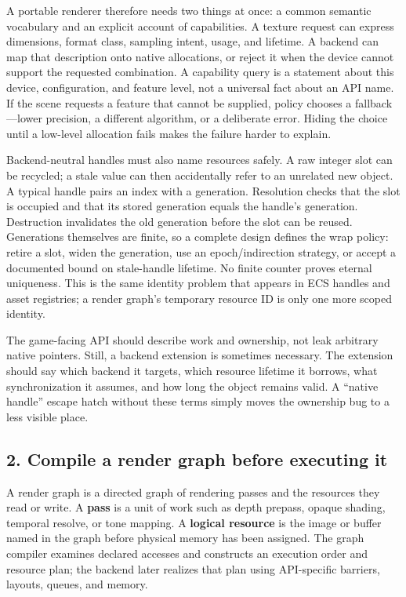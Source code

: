 A portable renderer therefore needs two things at once: a common semantic vocabulary and an explicit account of capabilities. A texture request can express dimensions, format class, sampling intent, usage, and lifetime. A backend can map that description onto native allocations, or reject it when the device cannot support the requested combination. A capability query is a statement about this device, configuration, and feature level, not a universal fact about an API name. If the scene requests a feature that cannot be supplied, policy chooses a fallback---lower precision, a different algorithm, or a deliberate error. Hiding the choice until a low-level allocation fails makes the failure harder to explain.

Backend-neutral handles must also name resources safely. A raw integer slot can be recycled; a stale value can then accidentally refer to an unrelated new object. A typical handle pairs an index with a generation. Resolution checks that the slot is occupied and that its stored generation equals the handle's generation. Destruction invalidates the old generation before the slot can be reused. Generations themselves are finite, so a complete design defines the wrap policy: retire a slot, widen the generation, use an epoch/indirection strategy, or accept a documented bound on stale-handle lifetime. No finite counter proves eternal uniqueness. This is the same identity problem that appears in ECS handles and asset registries; a render graph's temporary resource ID is only one more scoped identity.

The game-facing API should describe work and ownership, not leak arbitrary native pointers. Still, a backend extension is sometimes necessary. The extension should say which backend it targets, which resource lifetime it borrows, what synchronization it assumes, and how long the object remains valid. A ``native handle'' escape hatch without these terms simply moves the ownership bug to a less visible place.

\subsection{2. Compile a render graph before executing it}\label{06-engine-ii-ch042-compile-a-render-graph-before-executing-it}

\hypertarget{06-engine-ii-ch042-compile-a-render-graph-before-executing-it}{}

A render graph is a directed graph of rendering passes and the resources they read or write. A \textbf{pass} is a unit of work such as depth prepass, opaque shading, temporal resolve, or tone mapping. A \textbf{logical resource} is the image or buffer named in the graph before physical memory has been assigned. The graph compiler examines declared accesses and constructs an execution order and resource plan; the backend later realizes that plan using API-specific barriers, layouts, queues, and memory.

